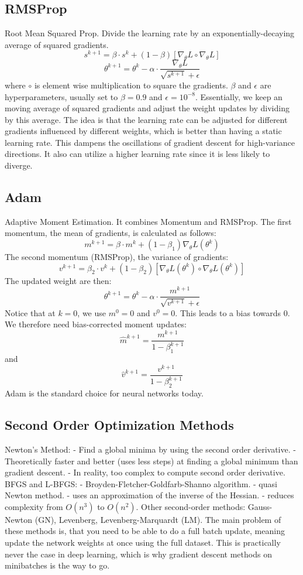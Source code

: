 \documentclass{scrartcl}
\begin{document}
\subsection*{RMSProp}
Root Mean Squared Prop.
Divide the learning rate by an exponentially-decaying average of squared gradients.
$$s^{k+1} = \beta \cdot s^k + (1-\beta)[\nabla_\theta L \circ \nabla_\theta L]$$
$$\theta^{k+1} = \theta^k - \alpha \cdot \frac{\nabla_\theta L}{\sqrt{s^{k+1}} + \epsilon}$$
where $\circ$ is element wise multiplication to square the gradients. $\beta$ and $\epsilon$ are hyperparameters, usually set to $\beta = 0.9$ and $\epsilon = 10^{-8}$.
Essentially, we keep an moving average of squared gradients and adjust the weight updates by dividing by this average. The idea is that the learning rate can be adjusted for different gradients influenced by different weights, which is better than having a static learning rate.
This dampens the oscillations of gradient descent for high-variance directions.
It also can utilize a higher learning rate since it is less likely to diverge.

\subsection*{Adam}
Adaptive Moment Estimation.
It combines Momentum and RMSProp.
The first momentum, the mean of gradients, is calculated as follows:
$$m^{k+1} = \beta \cdot m^k + (1 - \beta_1) \nabla_\theta L(\theta^k)$$
The second momentum (RMSProp), the variance of gradients:
$$v^{k+1} = \beta_2 \cdot v^k + (1-\beta_2)[\nabla_\theta L(\theta^k) \circ \nabla_\theta L(\theta^k)]$$
The updated weight are then:
$$\theta^{k+1} = \theta^k - \alpha \cdot \frac{m^{k+1}}{\sqrt{v^{k+1}} + \epsilon}$$
Notice that at $k = 0$, we use $m^0 = 0$ and $v^0 = 0$. This leads to a bias towards 0. We therefore need bias-corrected moment updates:
$$\hat{m}^{k+1} = \frac{m^{k+1}}{1 - \beta_1^{k+1}}$$
and
$$\hat{v}^{k+1} = \frac{v^{k+1}}{1 - \beta_2^{k+1}}$$
Adam is the standard choice for neural networks today.

\subsection*{Second Order Optimization Methods}
Newton's Method:
- Find a global minima by using the second order derivative.
- Theoretically faster and better (uses less steps) at finding a global minimum than gradient descent.
- In reality, too complex to compute second order derivative.
BFGS and L-BFGS:
- Broyden-Fletcher-Goldfarb-Shanno algorithm.
- quasi Newton method.
- uses an approximation of the inverse of the Hessian.
- reduces complexity from $O(n^3)$ to $O(n^2)$.
Other second-order methods: Gauss-Newton (GN), Levenberg, Levenberg-Marquardt (LM).
The main problem of these methods is, that you need to be able to do a full batch update, meaning update the network weights at once using the full dataset. This is practically never the case in deep learning, which is why gradient descent methods on minibatches is the way to go.
\end{document}

